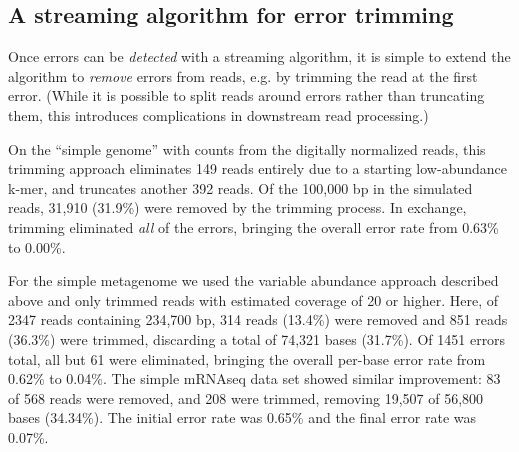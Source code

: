 \documentclass{article}
\begin{document}
\subsection{A streaming algorithm for error trimming}

Once errors can be {\em detected} with a streaming algorithm, it is
simple to extend the algorithm to {\em remove} errors from reads,
e.g. by trimming the read at the first error.  (While it is possible
to split reads around errors rather than truncating them, this
introduces complications in downstream read processing.)


On the ``simple genome'' with counts from the digitally normalized
reads, this trimming approach eliminates 149 reads entirely due to a
starting low-abundance k-mer, and truncates another 392 reads.  Of the
100,000 bp in the simulated reads, 31,910 (31.9\%) were removed by the
trimming process.  In exchange, trimming eliminated {\em all} of the
errors, bringing the overall error rate from 0.63\% to 0.00\%.


For the simple metagenome we used the variable abundance approach
described above and only trimmed reads with estimated coverage of 20
or higher.  Here, of 2347 reads containing 234,700 bp, 314 reads
(13.4\%) were removed and 851 reads (36.3\%) were trimmed, discarding
a total of 74,321 bases (31.7\%).  Of 1451 errors total, all but 61
were eliminated, bringing the overall per-base error rate from 0.62\% to
0.04\%.  The simple mRNAseq data set showed similar improvement: 83 of
568 reads were removed, and 208 were trimmed, removing 19,507 of
56,800 bases (34.34\%).  The initial error rate was 0.65\% and the
final error rate was 0.07\%.



\end{document}
